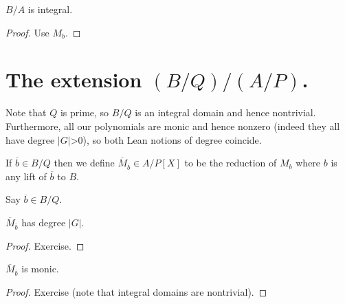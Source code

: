 \begin{theorem}
  \label{MulSemiringAction.CharacteristicPolynomial.isIntegral}
  $B/A$ is integral.
\end{theorem}
\begin{proof} Use $M_b$.
\end{proof}

\section{The extension $(B/Q)/(A/P)$.}

Note that $Q$ is prime, so $B/Q$ is an integral domain and hence nontrivial.
Furthermore, all our polynomials are monic and hence nonzero (indeed they
all have degree $|G|$>0), so both Lean notions of degree coincide.

\begin{definition}
  \label{MulSemiringAction.CharacteristicPolynomial.Mbar}
  \leanok
  If $\overline{b}\in B/Q$ then we define $\overline{M}_{\overline{b}}\in A/P[X]$
  to be the reduction of $M_b$ where $b$ is any lift of $\overline{b}$ to $B$.
\end{definition}

Say $\overline{b}\in B/Q$.

\begin{theorem}
  \label{MulSemiringAction.CharacteristicPolynomial.Mbar_deg}
  $\overline{M}_{\overline{b}}$ has degree $|G|$.
\end{theorem}
\begin{proof} Exercise.
\end{proof}

\begin{theorem}
  \label{MulSemiringAction.CharacteristicPolynomial.Mbar_monic}
    $\overline{M}_{\overline{b}}$ is monic.
\end{theorem}
\begin{proof} Exercise (note that integral domains are nontrivial).
\end{proof}

